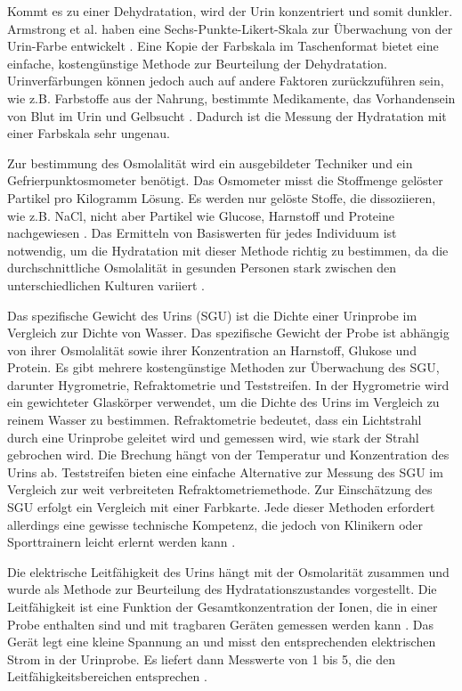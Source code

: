 \documentclass[10pt,a4paper,headinclude,twoside, plainheadsepline, open=right, numbers=noenddot, twocolumn]{article}
\begin{document}
Kommt es zu einer Dehydratation, wird der Urin konzentriert und somit dunkler.
Armstrong et al. haben eine Sechs-Punkte-Likert-Skala zur Überwachung von der Urin-Farbe entwickelt \cite{armstrong1994urinary}.
Eine Kopie der Farbskala im Taschenformat bietet eine einfache, kostengünstige Methode zur Beurteilung der Dehydratation.
Urinverfärbungen können jedoch auch auf andere Faktoren zurückzuführen sein, wie z.B. Farbstoffe aus der Nahrung, bestimmte Medikamente, das Vorhandensein von Blut im Urin und Gelbsucht \cite{garret2018engineering}.
Dadurch ist die Messung der Hydratation mit einer Farbskala sehr ungenau.

Zur bestimmung des Osmolalität wird ein ausgebildeter Techniker und ein Gefrierpunktosmometer benötigt.
Das Osmometer misst die Stoffmenge gelöster Partikel pro Kilogramm Lösung. 
Es werden nur gelöste Stoffe, die dissoziieren, wie z.B. NaCl, nicht aber Partikel wie Glucose, Harnstoff und Proteine nachgewiesen \cite{oppliger2002hydration}. 
Das Ermitteln von Basiswerten für jedes Individuum ist notwendig, um die Hydratation mit dieser Methode richtig zu bestimmen, da die durchschnittliche Osmolalität in gesunden Personen stark zwischen den unterschiedlichen Kulturen variiert \cite{garret2018engineering}.

Das spezifische Gewicht des Urins (SGU) ist die Dichte einer Urinprobe im Vergleich zur Dichte von Wasser.
Das spezifische Gewicht der Probe ist abhängig von ihrer Osmolalität sowie ihrer Konzentration an Harnstoff, Glukose und Protein. 
Es gibt mehrere kostengünstige Methoden zur Überwachung des SGU, darunter Hygrometrie, Refraktometrie und Teststreifen. 
In der Hygrometrie wird ein gewichteter Glaskörper verwendet, um die Dichte des Urins im Vergleich zu reinem Wasser zu bestimmen.
Refraktometrie bedeutet, dass ein Lichtstrahl durch eine Urinprobe geleitet wird und gemessen wird, wie stark der Strahl gebrochen wird.
Die Brechung hängt von der Temperatur und Konzentration des Urins ab.
Teststreifen bieten eine einfache Alternative zur Messung des SGU im Vergleich zur weit verbreiteten Refraktometriemethode.
Zur Einschätzung des SGU erfolgt ein Vergleich mit einer Farbkarte.
Jede dieser Methoden erfordert allerdings eine gewisse technische Kompetenz, die jedoch von Klinikern oder Sporttrainern leicht erlernt werden kann \cite{oppliger2002hydration}.

Die elektrische Leitfähigkeit des Urins hängt mit der Osmolarität zusammen und wurde als Methode zur Beurteilung des Hydratationszustandes vorgestellt.
Die Leitfähigkeit ist eine Funktion der Gesamtkonzentration der Ionen, die in einer Probe enthalten sind und mit tragbaren Geräten  gemessen werden kann \cite{shirreffs1998urine}.
Das Gerät legt eine kleine Spannung an und misst den entsprechenden elektrischen Strom in der Urinprobe.
Es liefert dann Messwerte von 1 bis 5, die den Leitfähigkeitsbereichen entsprechen \cite{garret2018engineering}.
\end{document}

